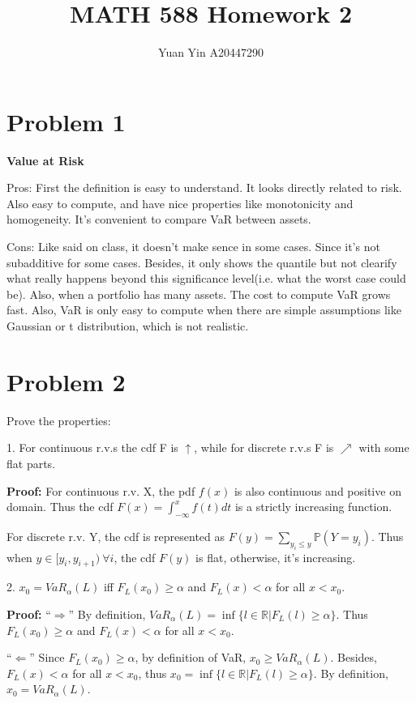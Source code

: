 \documentclass[letterpaper,11pt]{article}
\author{Yuan Yin A20447290}
\title{MATH 588 Homework 2}
\begin{document}
\large
\maketitle
\begin{spacing}{1.2}  %
\section*{Problem 1}

\textbf{Value at Risk}

Pros: First the definition is easy to understand. It looks directly related to risk. Also easy to compute, and have nice properties like monotonicity and homogeneity. It's convenient to compare VaR between assets.

Cons: Like said on class, it doesn't make sence in some cases. Since it's not subadditive for some cases. Besides, it only shows the quantile but not clearify what really happens beyond this significance level(i.e. what the worst case could be). Also, when a portfolio has many assets. The cost to compute VaR grows fast. Also, VaR is only easy to compute when there are simple assumptions like Gaussian or t distribution, which is not realistic.

\section*{Problem 2}

Prove the properties:

1. For continuous r.v.s the cdf F is $\uparrow$, while for discrete r.v.s F is $\nearrow$ with some flat parts.

\textbf{Proof:} For continuous r.v. X, the pdf $f(x)$ is also continuous and positive on domain. Thus the cdf $F(x) = \int_{-\infty}^x f(t)dt$ is a strictly increasing function.

For discrete r.v. Y, the cdf is represented as $F(y) = \sum_{y_i \le y} \mathbb{P}(Y=y_i)$. Thus when $y \in [y_i, y_{i+1}) 
\  \forall i$, the cdf $F(y)$ is flat, otherwise, it's increasing.

2. $x_0 = VaR_{\alpha}(L)$ iff $F_L(x_0) \ge \alpha$ and $F_L(x) < \alpha$ for all $x < x_0$.

\textbf{Proof:} ``$\Rightarrow$'' By definition, $VaR_{\alpha}(L) = \inf \{l \in \mathbb{R} | F_L(l) \ge \alpha\}$. Thus $F_L(x_0) \ge \alpha$ and $F_L(x) < \alpha$ for all $x < x_0$.

``$\Leftarrow$'' Since $F_L(x_0) \ge \alpha$, by definition of VaR, $x_0 \ge VaR_{\alpha}(L)$. Besides, $F_L(x) < \alpha$ for all $x < x_0$, thus $x_0 = \inf \{l \in \mathbb{R} | F_L(l) \ge \alpha\}$. By definition, $x_0 = VaR_{\alpha}(L)$.


\end{spacing}
\end{document}
